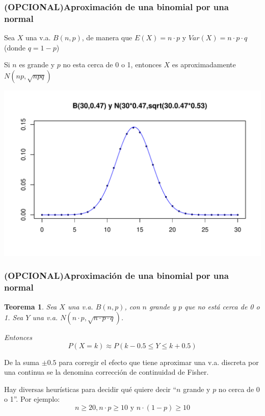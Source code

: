 \documentclass[handout]{beamer}\usepackage[]{graphicx}\usepackage[]{color}
\makeatletter
\def\maxwidth{ %
  \ifdim\Gin@nat@width>\linewidth
    \linewidth
  \else
    \Gin@nat@width
  \fi
}
\newenvironment{knitrout}{}{} %
\renewcommand{\emph}[1]{{\color{red}#1}}
\renewcommand{\leq}{\leqslant}
\renewcommand{\geq}{\geqslant}
\theoremstyle{plain}
\newtheorem{teorema}{Teorema}
\theoremstyle{definition}
\makeatother
\begin{document}
\begin{frame}
\frametitle{(OPCIONAL)Aproximación de una binomial por una normal}
\vspace*{-1ex}

Sea  $X$ una v.a. $B(n,p)$, de manera  que $E(X)=n\cdot p$  y
$Var(X)=n\cdot p\cdot q$ (donde $q=1-p$)
\medskip

Si $n$ es grande y $p$ no esta cerca de  0 o 1, entonces  $X$ es aproximadamente $N(np,\sqrt{npq})$
\vspace*{-1ex}

\begin{knitrout}
\color{fgcolor}
\includegraphics[width=\maxwidth]{figure/unnamed-chunk-3-1} 

\end{knitrout}
\end{frame}

\begin{frame}
\frametitle{(OPCIONAL)Aproximación de una binomial por una normal}
\vspace*{-2ex}

\begin{teorema}
Sea  $X$ una v.a. $B(n,p)$, con $n$ grande y $p$ que no está cerca de 0 o 1. Sea $Y$ una v.a. $N(n\cdot p,\sqrt{n\cdot p\cdot q})$. 

Entonces 
$$
P(X=k)\approx  P\left(k-0.5\leq Y\leq k+0.5\right)
$$
\end{teorema}
De la suma $\pm 0.5$ para corregir el efecto que tiene aproximar una v.a. discreta por una continua se la denomina \emph{corrección de continuidad de Fisher}.
\medskip

Hay diversas heurísticas  para decidir qué quiere decir ``$n$ grande y $p$ no cerca de 0 o 1''. Por ejemplo: $$n\geq 20, n\cdot p\geq 10\mbox{ y }n\cdot (1-p)\geq 10$$

\end{frame}
\end{document}
